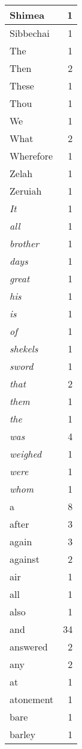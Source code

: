 \begin{center}
\begin{longtable}{l|r}
Shimea & 1 \\ \hline
Sibbechai & 1 \\ \hline
The & 1 \\ \hline
Then & 2 \\ \hline
These & 1 \\ \hline
Thou & 1 \\ \hline
We & 1 \\ \hline
What & 2 \\ \hline
Wherefore & 1 \\ \hline
Zelah & 1 \\ \hline
Zeruiah & 1 \\ \hline
\emph{It} & 1 \\ \hline
\emph{all} & 1 \\ \hline
\emph{brother} & 1 \\ \hline
\emph{days} & 1 \\ \hline
\emph{great} & 1 \\ \hline
\emph{his} & 1 \\ \hline
\emph{is} & 1 \\ \hline
\emph{of} & 1 \\ \hline
\emph{shekels} & 1 \\ \hline
\emph{sword} & 1 \\ \hline
\emph{that} & 2 \\ \hline
\emph{them} & 1 \\ \hline
\emph{the} & 1 \\ \hline
\emph{was} & 4 \\ \hline
\emph{weighed} & 1 \\ \hline
\emph{were} & 1 \\ \hline
\emph{whom} & 1 \\ \hline
a & 8 \\ \hline
after & 3 \\ \hline
again & 3 \\ \hline
against & 2 \\ \hline
air & 1 \\ \hline
all & 1 \\ \hline
also & 1 \\ \hline
and & 34 \\ \hline
answered & 2 \\ \hline
any & 2 \\ \hline
at & 1 \\ \hline
atonement & 1 \\ \hline
bare & 1 \\ \hline
barley & 1 \\ \hline

\end{longtable}
\end{center}
